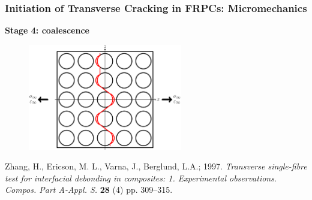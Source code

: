 \documentclass[first,firstsupp,lastsupp,last,hyperref,table]{ETHclass}
\begin{document}
\begin{frame}
\frametitle{\vspace{0.2cm}\small Initiation of Transverse Cracking in FRPCs: Micromechanics}
\vspace{-0.5cm}
\centering
\begin{alertblock}{\centering\scriptsize\bf Stage 4: coalescence}
\vspace{-0.25cm}
\begin{figure}
\centering
\includegraphics[width=0.6\textwidth]{stage4-coalescence.pdf}
\end{figure}
\end{alertblock}
\vspace{-0.5cm}
{\tiny Zhang, H., Ericson, M. L., Varna, J., Berglund, L.A.; 1997. {\em\tiny Transverse single-fibre test for interfacial debonding in composites: 1. Experimental observations}. {\it\tiny Compos. Part A-Appl. S.} {\bf\tiny 28} (4) pp. 309--315.}
\end{frame}
\end{document}

